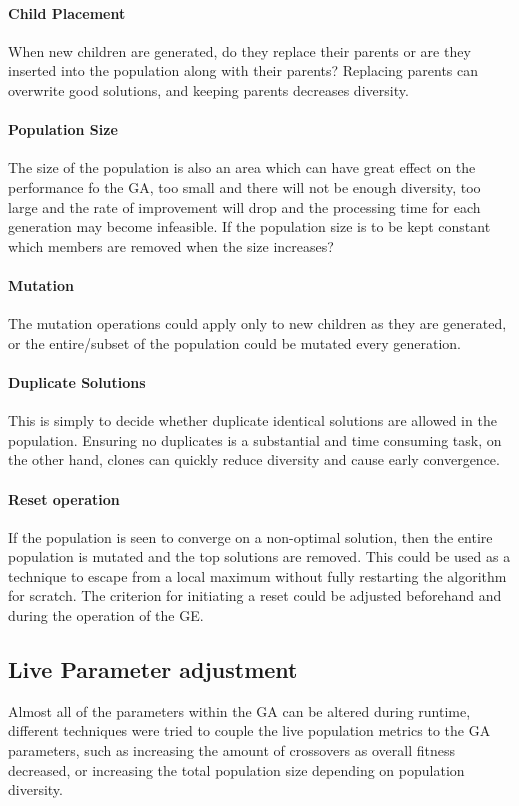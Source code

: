 \documentclass[14pt]{acmsiggraph}
\begin{document}
\paragraph{Child Placement}
When new children are generated, do they replace their parents or are they inserted into the population along with their parents? Replacing parents can overwrite good solutions, and keeping parents decreases diversity.

\paragraph{Population Size}
The size of the population is also an area which can have great effect on the performance fo the GA, too small and there will not be enough diversity, too large and the rate of improvement will drop and the processing time for each generation may become infeasible. If the population size is to be kept constant which members are removed when the size increases?

\paragraph{Mutation}
The  mutation operations could apply only to new children as they are generated, or the entire/subset of the population could be mutated every generation.

\paragraph{Duplicate Solutions}
This is simply to decide whether duplicate identical solutions are allowed in the population. Ensuring no duplicates is a substantial and time consuming task, on the other hand, clones can quickly reduce diversity and cause early convergence.

\paragraph{Reset operation}
If the population is seen to converge on a non-optimal solution, then the entire population is mutated and the top solutions are removed. This could be  used as a technique to escape from a local maximum without fully restarting the algorithm for scratch. The criterion for initiating a reset could be adjusted beforehand and during the operation of the GE.

\subsection{Live Parameter adjustment}
Almost all of the parameters within the GA can be altered during runtime, different techniques were tried to couple the live population metrics to the GA parameters, such as increasing the amount of crossovers as overall fitness decreased, or increasing the total population size depending on population diversity.
\end{document}
